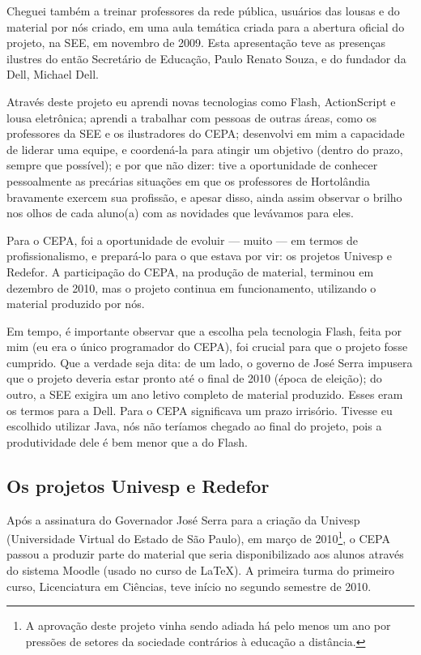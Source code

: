 Cheguei também a treinar professores da rede pública, usuários das lousas e do material por nós criado, em uma aula temática criada para a abertura oficial do projeto, na SEE, em novembro de 2009. Esta apresentação teve as presenças ilustres do então Secretário de Educação, Paulo Renato Souza, e do fundador da Dell, Michael Dell.

Através deste projeto eu aprendi novas tecnologias como Flash, ActionScript e lousa eletrônica; aprendi a trabalhar com pessoas de outras áreas, como os professores da SEE e os ilustradores do CEPA; desenvolvi em mim a capacidade de liderar uma equipe, e coordená-la para atingir um objetivo (dentro do prazo, sempre que possível); e por que não dizer: tive a oportunidade de conhecer pessoalmente as precárias situações em que os professores de Hortolândia bravamente exercem sua profissão, e apesar disso, ainda assim observar o brilho nos olhos de cada aluno(a) com as novidades que levávamos para eles.

Para o CEPA, foi a oportunidade de evoluir --- muito --- em termos de profissionalismo, e prepará-lo para o que estava por vir: os projetos Univesp e Redefor. A participação do CEPA, na produção de material, terminou em dezembro de 2010, mas o projeto continua em funcionamento, utilizando o material produzido por nós.

Em tempo, é importante observar que a escolha pela tecnologia Flash, feita por mim (eu era o único programador do CEPA), foi crucial para que o projeto fosse cumprido. Que a verdade seja dita: de um lado, o governo de José Serra impusera que o projeto deveria estar pronto até o final de 2010 (época de eleição); do outro, a SEE exigira um ano letivo completo de material produzido. Esses eram os termos para a Dell. Para o CEPA significava um prazo irrisório. Tivesse eu escolhido utilizar Java, nós não teríamos chegado ao final do projeto, pois a produtividade dele é bem menor que a do Flash.

\subsection{Os projetos Univesp e Redefor}

Após a assinatura do Governador José Serra para a criação da Univesp (Universidade Virtual do Estado de São Paulo), em março de 2010\footnote{A aprovação deste projeto vinha sendo adiada há pelo menos um ano por pressões de setores da sociedade contrários à educação a distância.}, o CEPA passou a produzir parte do material que seria disponibilizado aos alunos através do sistema Moodle (usado no curso de \LaTeX). A primeira turma do primeiro curso, Licenciatura em Ciências, teve início no segundo semestre de 2010.

